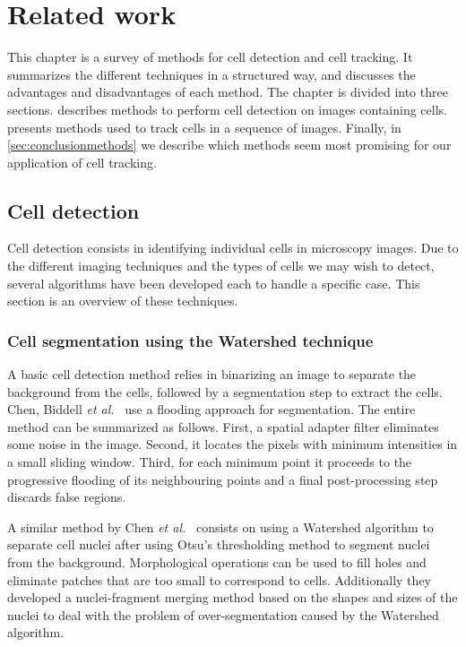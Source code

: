 \chapter{Related work \statusfirstdraft}
\label{chap:relatedwork}
This chapter is a survey of methods for cell detection and cell tracking. It summarizes the different techniques in a structured way, and discusses the advantages and disadvantages of each method. The chapter is divided into three sections.  describes methods to perform cell detection on images containing cells.  presents methods used to track cells in a sequence of images. Finally, in \cref{sec:conclusionmethods} we describe which methods seem most promising for our application of cell tracking. 
	

\section{Cell detection \statusfirstdraft}
\label{sec:detection}
\label{sec:relatedworkdetection}

Cell detection consists in identifying individual cells in microscopy images. Due to the different imaging techniques and the types of cells we may wish to detect, several algorithms have been developed each to handle a specific case. This section is an overview of these techniques.

\subsection{Cell segmentation using the Watershed technique \statusfirstdraft}

A basic cell detection method relies in binarizing an image to separate the background from the cells, followed by a segmentation step to extract the cells. Chen, Biddell \emph{et al.}~\cite{chen99} use a flooding approach for segmentation. The entire method can be summarized as follows. First, a spatial adapter filter eliminates some noise in the image. Second, it locates the pixels with minimum intensities in a small sliding window. Third, for each minimum point it proceeds to the progressive flooding of its neighbouring points and a final post-processing step discards false regions.

A similar method by Chen \emph{et al.}~\cite{chen06} consists on using a Watershed algorithm \cite{vincent93} to separate cell nuclei after using Otsu's thresholding method to segment nuclei from the background. Morphological operations \cite{serra83} can be used to fill holes and eliminate patches that are too small to correspond to cells. Additionally they developed a nuclei-fragment merging method based on the shapes and sizes of the nuclei to deal with the problem of over-segmentation caused by the Watershed algorithm.

